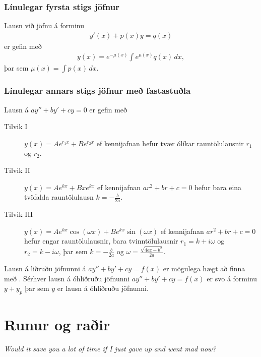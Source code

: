 \documentclass[a4paper,10pt,icelandic]{sphinxmanual}
\begin{document}
\subsection{Línulegar fyrsta stigs jöfnur}
\label{kafli08:linulegar-fyrsta-stigs-jofnur}
Lausn við jöfnu á forminu
\begin{equation*}
\begin{split}y'(x) + p(x)y = q(x)\end{split}
\end{equation*}
er gefin með
\begin{equation*}
\begin{split}y(x) = e^{-\mu(x)} \int e^{\mu(x)} q(x)\, dx,\end{split}
\end{equation*}
þar sem \(\mu(x) = \int p(x)\, dx\).


\subsection{Línulegar annars stigs jöfnur með fastastuðla}
\label{kafli08:linulegar-annars-stigs-jofnur-me-fastastula}
Lausn á \(ay''+by'+cy=0\) er gefin með
\begin{description}
\item[{Tilvik I}] \leavevmode
\(y(x)=Ae^{r_1x}+Be^{r_2x}\)
ef kennijafnan hefur tvær ólíkar rauntölulausnir \(r_1\) og
\(r_2\).

\item[{Tilvik II}] \leavevmode
\(y(x)=Ae^{kx}+Bxe^{kx}\)
ef kennijafnan \(ar^2+br+c=0\) hefur bara eina tvöfalda rauntölulausn
\(k=-\frac{b}{2a}\).

\item[{Tilvik III}] \leavevmode
\(y(x)=Ae^{kx}\cos(\omega x)+Be^{kx}\sin(\omega x)\)
ef kennijafnan \(ar^2+br+c=0\) hefur engar rauntölulausnir,
bara tvinntölulausnir \(r_1=k+i\omega\) og
\(r_2=k-i\omega\), þar sem
\(k=-\frac{b}{2a}\) og \(\omega=\frac{\sqrt{4ac-b^2}}{2a}\).

\end{description}

Lausn á liðruðu jöfnunni  á \(ay''+by'+cy=f(x)\) er mögulega hægt að finna
með {\hyperref[kafli08:agiskun]{}}. Sérhver lausn á óhliðruðu jöfnunni \(ay''+by'+cy=f(x)\)
er svo á forminu \(y+y_p\) þar sem \(y\) er
lausn á óhliðruðu jöfnunni.


\chapter{Runur og raðir}
\label{kafli09:runur-og-rair}\label{kafli09::doc}
\emph{Would it save you a lot of time if I just gave up and went mad now?}
\end{document}
